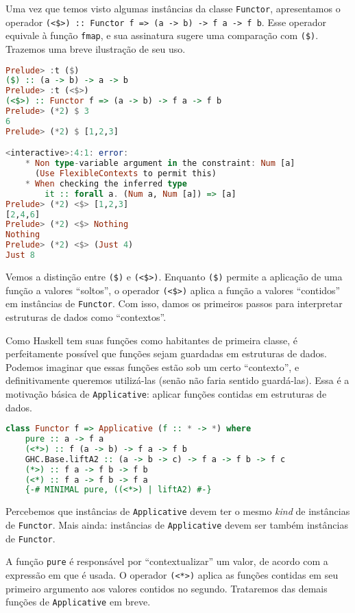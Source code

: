 \documentclass[a4paper]{article}
\begin{document}
Uma vez que temos visto algumas instâncias da classe \texttt{Functor}, apresentamos o operador \mbox{\texttt{(<\$>) :: Functor f => (a -> b) -> f a -> f b}}.
Esse operador equivale à função \texttt{fmap}, e sua assinatura sugere uma comparação com \texttt{(\$)}.
Trazemos uma breve ilustração de seu uso.

\pagebreak

\begin{lstlisting}[language=haskell, frame=single]
Prelude> :t ($)
($) :: (a -> b) -> a -> b
Prelude> :t (<$>)
(<$>) :: Functor f => (a -> b) -> f a -> f b
Prelude> (*2) $ 3
6
Prelude> (*2) $ [1,2,3]

<interactive>:4:1: error:
	* Non type-variable argument in the constraint: Num [a]
	  (Use FlexibleContexts to permit this)
	* When checking the inferred type
		it :: forall a. (Num a, Num [a]) => [a]
Prelude> (*2) <$> [1,2,3]
[2,4,6]
Prelude> (*2) <$> Nothing
Nothing
Prelude> (*2) <$> (Just 4)
Just 8
\end{lstlisting}

Vemos a distinção entre \texttt{(\$)} e \texttt{(<\$>)}.
Enquanto \texttt{(\$)} permite a aplicação de uma função a valores ``soltos'', o operador \texttt{(<\$>)} aplica a função a valores ``contidos'' em instâncias de \texttt{Functor}.
Com isso, damos os primeiros passos para interpretar estruturas de dados como ``contextos''.

Como Haskell tem suas funções como habitantes de primeira classe, é perfeitamente possível que funções sejam guardadas em estruturas de dados.
Podemos imaginar que essas funções estão sob um certo ``contexto'', e definitivamente queremos utilizá-las (senão não faria sentido guardá-las).
Essa é a motivação básica de \texttt{Applicative}: aplicar funções contidas em estruturas de dados.

\begin{lstlisting}[language=haskell, frame=single]
class Functor f => Applicative (f :: * -> *) where
	pure :: a -> f a
	(<*>) :: f (a -> b) -> f a -> f b
	GHC.Base.liftA2 :: (a -> b -> c) -> f a -> f b -> f c
	(*>) :: f a -> f b -> f b
	(<*) :: f a -> f b -> f a
	{-# MINIMAL pure, ((<*>) | liftA2) #-}
\end{lstlisting}

Percebemos que instâncias de \texttt{Applicative} devem ter o mesmo \emph{kind} de instâncias de \texttt{Functor}.
Mais ainda: instâncias de \texttt{Applicative} devem ser também instâncias de \texttt{Functor}.

A função \texttt{pure} é responsável por ``contextualizar'' um valor, de acordo com a expressão em que é usada.
O operador \texttt{(<*>)} aplica as funções contidas em seu primeiro argumento aos valores contidos no segundo.
Trataremos das demais funções de \texttt{Applicative} em breve.
\end{document}
